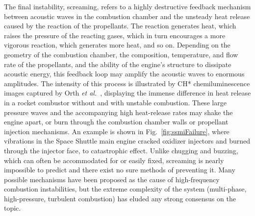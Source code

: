 The final instability, screaming, refers to a highly destructive feedback mechanism between acoustic waves in the combustion chamber and the unsteady heat release caused by the reaction of the propellants. The reaction generates heat, which raises the pressure of the reacting gases, which in turn encourages a more vigorous reaction, which generates more heat, and so on. Depending on the geometry of the combustion chamber, the composition, temperature, and flow rate of the propellants, and the ability of the engine's structure to dissipate acoustic energy, this feedback loop may amplify the acoustic waves to enormous amplitudes. The intensity of this process is illustrated by CH* chemiluminescence images captured by Orth \textit{et al.}~\cite{Orth2018}, displaying the immense difference in heat release in a rocket combustor without and with unstable combustion. These large pressure waves and the accompanying high heat-release rates may shake the engine apart, or burn through the combustion chamber walls or propellant injection mechanisms. An example is shown in Fig.~\ref{fig:ssmiFailure}, where vibrations in the Space Shuttle main engine cracked oxidizer injectors and burned through the injector face, to catastrophic effect. Unlike chugging and buzzing, which can often be accommodated for or easily fixed, screaming is nearly impossible to predict and there exist no sure methods of preventing it. Many possible mechanisms have been proposed as the cause of high-frequency combustion instabilities, but the extreme complexity of the system (multi-phase, high-pressure, turbulent combustion) has eluded any strong consensus on the topic.


